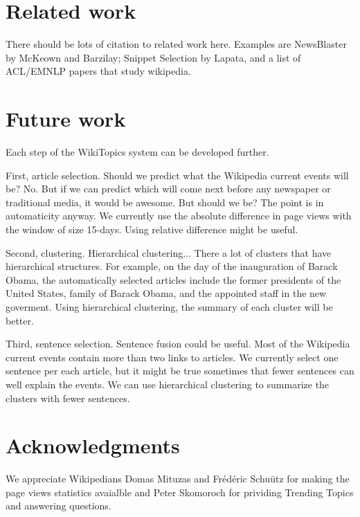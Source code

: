 \documentclass[11pt]{article}
\begin{document}
\section{Related work}
\label{sec:related-work}

There should be lots of citation to related work here. Examples are NewsBlaster by McKeown and Barzilay; Snippet Selection by Lapata, and a list of ACL/EMNLP papers that study wikipedia.

\section{Future work}

Each step of the WikiTopics system can be developed further.

First, article selection.
Should we predict what the Wikipedia current events will be?
No.
But if we can predict which will come next before any newspaper or traditional media, it would be awesome.
But should we be? The point is in automaticity anyway.
We currently use the absolute difference in page views with the window of size 15-days.
Using relative difference might be useful.

Second, clustering.
Hierarchical clustering... There a lot of clusters that have hierarchical structures. For example, on the day of the
inauguration of Barack Obama, the automatically selected articles include
the former presidents of the United States, family of Barack Obama,
and the appointed staff in the new goverment.
Using hierarchical clustering, the summary of each cluster will be better.

Third, sentence selection. Sentence fusion could be useful. Most of the Wikipedia current events 
contain more than two links to articles. We currently select one sentence per each article,
but it might be true sometimes that fewer sentences can well explain the events.
We can use hierarchical clustering to summarize the clusters with fewer sentences.

\section*{Acknowledgments}


We appreciate Wikipedians Domas Mituzas and Fr\'{e}d\'{e}ric Schu\"{u}tz
for making the page views statistics avaialble and Peter Skomoroch for
prividing Trending Topics and answering questions.



\end{document}
